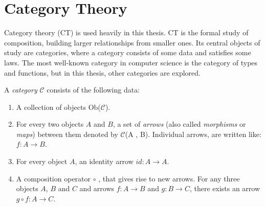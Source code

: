 
\section{Category Theory}
Category theory (CT) is used heavily in this thesis. CT is the formal study of composition, building larger relationships from smaller ones. Its central objects of study are categories, where a category consists of some data and satisfies some laws. The most well-known category in computer science is the category of types and functions, but in this thesis, other categories are explored. 




A \textit{category} $\mathcal{C}$ consists of the following data:

\begin{enumerate}
  \item A collection of objects Ob($\mathcal{C}$).
  \item For every two objects $A$ and $B$, a set of \textit{arrows} (also called \textit{morphisms} or \textit{maps}) between them denoted by $\mathcal{C}$(A , B). Individual arrows, are written like: $f : A \rightarrow B $.
  \item For every object $A$, an identity arrow $id : A \rightarrow A$. 
  \item A composition operator $ \circ $ , that gives rise to new arrows. For any three objects $A$, $B$ and $C$ and arrows $f : A \rightarrow B $ and $g : B \rightarrow C $, there exists an arrow $g \circ f : A \rightarrow C $.
\end{enumerate}

